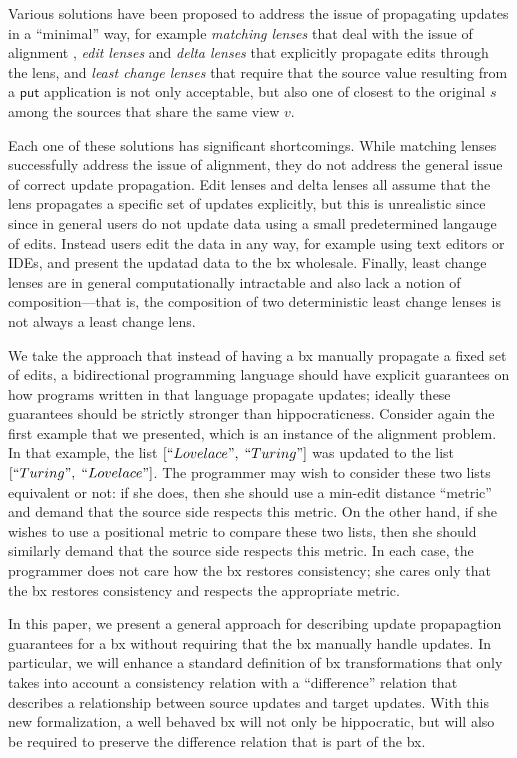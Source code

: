 \documentclass[acmsmall,review,anonymous]{acmart}\settopmatter{printfolios=true,printccs=false,printacmref=false}
\theoremstyle{definition}
\newcommand{\kw}[1]{\ensuremath{\mathsf{#1}}\xspace}
\newcommand{\pput}{\ensuremath{\kw{put}}\xspace}
\begin{document}
Various solutions have been proposed to address the issue of propagating updates in a ``minimal'' way, for example {\em matching lenses} that deal with the issue of alignment \cite{barbosa2010matching}, {\em edit lenses} \cite{hofmann2012edit} and {\em delta lenses} \cite{diskin2011asymmetric,diskin2011state,pacheco2012delta}
that explicitly propagate edits through the lens, and {\em least change
lenses} \cite{macedo2013composing} that require that the source value resulting from a \pput application is not only acceptable, but also one of closest to the original $s$ among the sources that share the same view $v$.

Each one of these solutions has significant shortcomings. While matching lenses successfully address the issue of alignment, they do not address the general issue of correct update propagation. Edit lenses and delta lenses all assume that the lens propagates a specific set of updates explicitly, but this is unrealistic since since in general users do not update data using a small predetermined langauge of edits. Instead users edit the data in any way, for example using text editors or IDEs, and present the updatad data to the bx wholesale. Finally, least change lenses are in general computationally intractable \cite{buneman2002propagation} and also lack a notion of composition---that is, the composition of two deterministic least change lenses is not always a least change lens\cite{macedo2013composing}.

We take the approach that instead of having a bx manually propagate a fixed set of edits, a bidirectional programming language should have explicit guarantees on how programs written in that language propagate updates; ideally these guarantees should be strictly stronger than hippocraticness. Consider again the first example that we presented, which is an instance of the alignment problem. In that example, the list
$[``Lovelace", \; ``Turing"]$ was updated to the list $[``Turing", \; ``Lovelace"]$. The programmer may wish to consider these two lists equivalent or not: if she does, then she should use a min-edit distance ``metric'' and demand that the source side respects this metric. On the other hand, if she wishes to use a positional metric to compare these two lists, then she should similarly demand that the source side respects this metric. In each case, the programmer does not care how the bx restores consistency; she cares only that the bx restores consistency and respects the appropriate metric.

In this paper, we present a general approach for describing update propapagtion guarantees for a bx without requiring that the bx manually handle updates. In particular, we will enhance a standard definition of bx transformations that only takes into account a consistency relation with a ``difference'' relation that describes a relationship between source updates and target updates. With this new formalization, a well behaved bx will not only be hippocratic, but will also be required to preserve the difference relation that is part of the bx.
\end{document}
